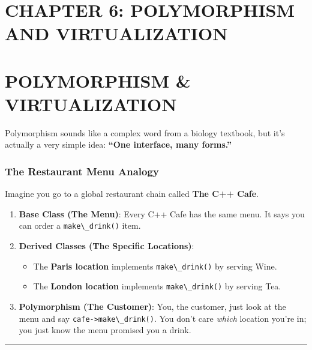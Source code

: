 \hypertarget{chapter-6-polymorphism-and-virtualization}{%
\section{CHAPTER 6: POLYMORPHISM AND
VIRTUALIZATION}\label{chapter-6-polymorphism-and-virtualization}}

\hypertarget{polymorphism-virtualization}{%
\section{POLYMORPHISM \&
VIRTUALIZATION}\label{polymorphism-virtualization}}

Polymorphism sounds like a complex word from a biology textbook, but
it's actually a very simple idea: \textbf{``One interface, many
forms.''}

\hypertarget{the-restaurant-menu-analogy}{%
\subsubsection{The Restaurant Menu
Analogy}\label{the-restaurant-menu-analogy}}

Imagine you go to a global restaurant chain called \textbf{The C++
Cafe}.

\begin{enumerate}
\def\labelenumi{\arabic{enumi}.}
\tightlist
\item
  \textbf{Base Class (The Menu)}: Every C++ Cafe has the same menu. It
  says you can order a \passthrough{\lstinline!make\_drink()!} item.
\item
  \textbf{Derived Classes (The Specific Locations)}:

  \begin{itemize}
  \tightlist
  \item
    The \textbf{Paris location} implements
    \passthrough{\lstinline!make\_drink()!} by serving Wine.
  \item
    The \textbf{London location} implements
    \passthrough{\lstinline!make\_drink()!} by serving Tea.
  \end{itemize}
\item
  \textbf{Polymorphism (The Customer)}: You, the customer, just look at
  the menu and say \passthrough{\lstinline!cafe->make\_drink()!}. You
  don't care \emph{which} location you're in; you just know the menu
  promised you a drink.
\end{enumerate}

\begin{center}\rule{0.5\linewidth}{0.5pt}\end{center}

